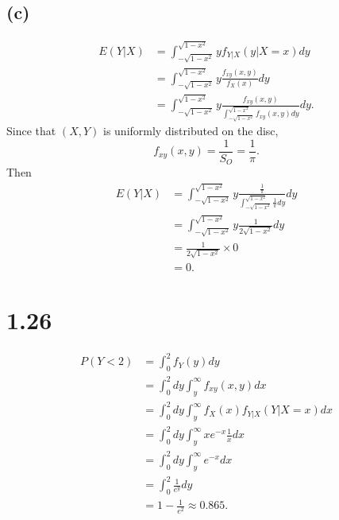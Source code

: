 \documentclass{article}
\begin{document}
\subsection{(c)}
\begin{align*}
    E(Y|X) &= \int_{-\sqrt{1-x^2}}^{\sqrt{1-x^2}} y f_{Y|X}(y|X = x) dy \\
    &= \int_{-\sqrt{1-x^2}}^{\sqrt{1-x^2}} y \frac{f_{xy}(x, y)}{f_X(x)} dy \\
    &= \int_{-\sqrt{1-x^2}}^{\sqrt{1-x^2}} y \frac{f_{xy}(x, y)}{\int_{-\sqrt{1-x^2}}^{\sqrt{1-x^2}} f_{xy}(x, y) dy} dy.
\end{align*}
Since that $(X, Y)$ is uniformly distributed on the disc, 
\begin{equation*}
    f_{xy}(x, y) = \frac{1}{S_{O}} = \frac{1}{\pi}.
\end{equation*}
Then
\begin{align*}
    E(Y|X) &= \int_{-\sqrt{1-x^2}}^{\sqrt{1-x^2}} y \frac{\frac{1}{\pi}}{\int_{-\sqrt{1-x^2}}^{\sqrt{1-x^2}} \frac{1}{\pi} dy} dy \\
    &= \int_{-\sqrt{1-x^2}}^{\sqrt{1-x^2}} y \frac{1}{2\sqrt{1-x^2}} dy \\
    &= \frac{1}{2\sqrt{1-x^2}} \times 0 \\
    &= 0.
\end{align*}

\section{1.26}
\begin{align*}
    P(Y<2) &= \int_0^2 f_Y(y) dy \\
    &= \int_0^2 dy \int_y^{\infty} f_{xy}(x, y) dx \\
    &= \int_0^2 dy \int_y^{\infty} f_X(x) f_{Y|X}(Y|X = x) dx \\
    &= \int_0^2 dy \int_y^{\infty} x e^{-x} \frac{1}{x} dx \\
    &= \int_0^2 dy \int_y^{\infty} e^{-x} dx \\
    &= \int_0^2 \frac{1}{e^y} dy \\
    &= 1 - \frac{1}{e^2} \approx 0.865.
\end{align*}
\end{document}
